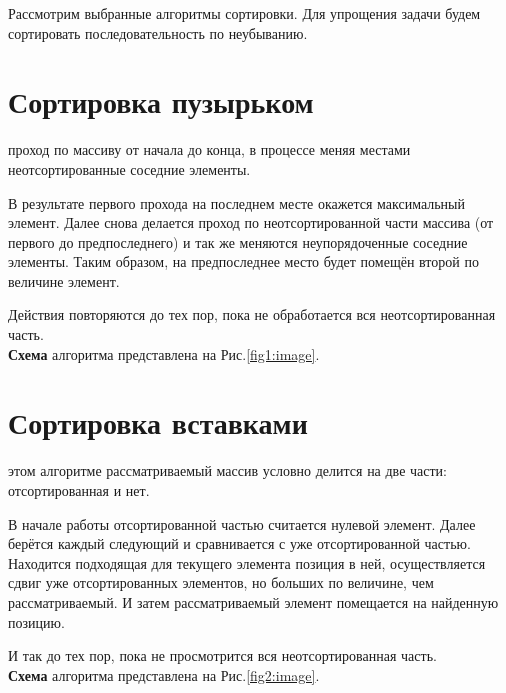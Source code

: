 Рассмотрим выбранные алгоритмы сортировки. Для упрощения задачи будем сортировать последовательность по неубыванию. 
\section{Сортировка пузырьком}
 проход по массиву от начала до конца, в процессе меняя местами неотсортированные соседние элементы.

В результате первого прохода на последнем месте окажется максимальный элемент. Далее снова делается проход по неотсортированной части массива (от первого до предпоследнего) и так же меняются неупорядоченные соседние элементы. Таким образом, на предпоследнее место будет помещён второй по величине элемент.

Действия повторяются до тех пор, пока не обработается вся неотсортированная часть. \\

\textbf{Схема} алгоритма представлена на Рис.\ref{fig1:image}.

\section{Сортировка вставками}
 этом алгоритме рассматриваемый массив условно делится на две части: отсортированная и нет. 

В начале работы отсортированной частью считается нулевой элемент. Далее берётся каждый следующий и сравнивается с уже отсортированной частью. Находится подходящая для текущего элемента позиция в ней, осуществляется сдвиг уже отсортированных элементов, но больших по величине, чем рассматриваемый. И затем рассматриваемый элемент помещается на найденную позицию.

И так до тех пор, пока не просмотрится вся неотсортированная часть.\\ 

\textbf{Схема} алгоритма представлена на Рис.\ref{fig2:image}.

